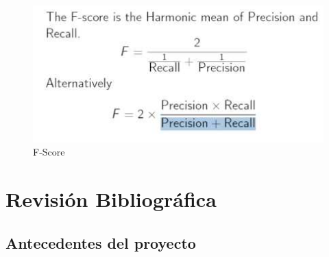 \documentclass[a4paper,11pt]{report}
\begin{document}
\begin{figure}[h]
	\centering
	\includegraphics[scale=0.7]{Metodologia2}
	\caption{F-Score}
	\label{fig:F-Score }
\end{figure}



\chapter{Revisión Bibliográfica}



\section{Antecedentes del proyecto }
\end{document}
